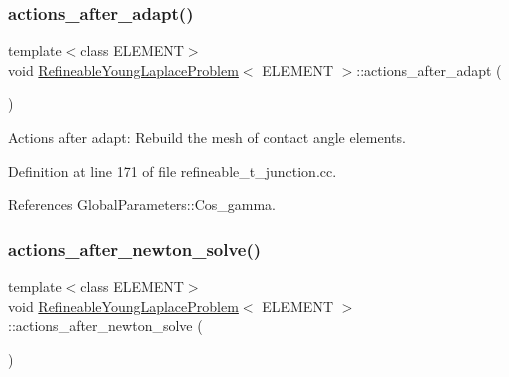 \subsubsection{\texorpdfstring{actions\+\_\+after\+\_\+adapt()}{actions\_after\_adapt()}\hspace{0.1cm}{\footnotesize\ttfamily [2/2]}}
{\footnotesize\ttfamily template$<$class E\+L\+E\+M\+E\+NT$>$ \\
void \hyperlink{classRefineableYoungLaplaceProblem}{Refineable\+Young\+Laplace\+Problem}$<$ E\+L\+E\+M\+E\+NT $>$\+::actions\+\_\+after\+\_\+adapt (\begin{DoxyParamCaption}{ }\end{DoxyParamCaption})\hspace{0.3cm}{\ttfamily [inline]}}



Actions after adapt\+: Rebuild the mesh of contact angle elements. 



Definition at line 171 of file refineable\+\_\+t\+\_\+junction.\+cc.



References Global\+Parameters\+::\+Cos\+\_\+gamma.

\mbox{\label{classRefineableYoungLaplaceProblem_a0791c90a16016372e09faf3f5721ecbe}} 
\subsubsection{\texorpdfstring{actions\+\_\+after\+\_\+newton\+\_\+solve()}{actions\_after\_newton\_solve()}\hspace{0.1cm}{\footnotesize\ttfamily [1/2]}}
{\footnotesize\ttfamily template$<$class E\+L\+E\+M\+E\+NT$>$ \\
void \hyperlink{classRefineableYoungLaplaceProblem}{Refineable\+Young\+Laplace\+Problem}$<$ E\+L\+E\+M\+E\+NT $>$\+::actions\+\_\+after\+\_\+newton\+\_\+solve (\begin{DoxyParamCaption}{ }\end{DoxyParamCaption})\hspace{0.3cm}{\ttfamily [inline]}}



